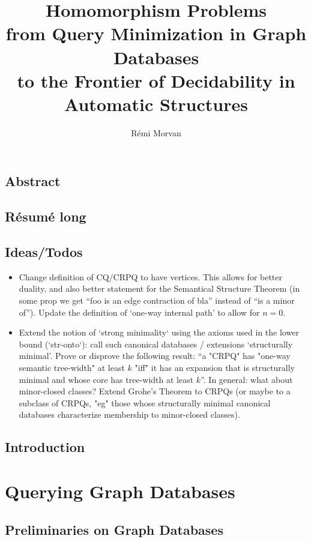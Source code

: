 \documentclass[a4paper,sfsidenotes,twoside,justified,nobib]{tufte-book-custom}
\title[Homomorphism Problems]{Homomorphism Problems\\from Query Minimization in Graph Databases\\ to the Frontier of Decidability in Automatic Structures}
\author{Rémi Morvan}
\begin{document}
\frontmatter




\mainmatter
\chapter*{Abstract}

\chapter*{Résumé long}

\chapter*{Ideas/Todos}

\begin{itemize}
	\item Change definition of CQ/CRPQ to have vertices. This allows for better duality,
		and also better statement for the Semantical Structure Theorem (in some prop we get
		``foo is an edge contraction of bla'' instead of ``is a minor of'').
		Update the definition of `one-way internal path' to allow for $n=0$.
	\item Extend the notion of `strong minimality` using the axioms used in the lower bound (`str-onto`): call such canonical databases / extensions `structurally minimal'.
	Prove or disprove the following result: ``a "CRPQ" has "one-way semantic tree-width" at least $k$ "iff" it has an expansion that is structurally minimal and whose core has tree-width at least $k$''. In general: what about minor-closed classes?
	Extend Grohe's Theorem to CRPQs (or maybe to a subclass of CRPQs, "eg" those whose
	structurally minimal canonical databases characterize membership to minor-closed classes).
\end{itemize}

\chapter{Introduction}

\part{Querying Graph Databases}

\chapter{Preliminaries on Graph Databases}
\end{document}

